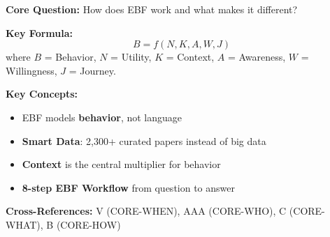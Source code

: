 \begin{tcolorbox}[colback=blue!5!white, colframe=blue!75!black,
    title=Quick Reference: EBF Framework]

\textbf{Core Question:} How does EBF work and what makes it different?

\textbf{Key Formula:}
\begin{equation}
B = f(N, K, A, W, J)
\end{equation}
where $B$ = Behavior, $N$ = Utility, $K$ = Context, $A$ = Awareness,
$W$ = Willingness, $J$ = Journey.

\textbf{Key Concepts:}
\begin{itemize}[nosep]
\item EBF models \textbf{behavior}, not language
\item \textbf{Smart Data}: 2,300+ curated papers instead of big data
\item \textbf{Context} is the central multiplier for behavior
\item \textbf{8-step EBF Workflow} from question to answer
\end{itemize}

\textbf{Cross-References:} V (CORE-WHEN), AAA (CORE-WHO), C (CORE-WHAT), B (CORE-HOW)
\end{tcolorbox}


